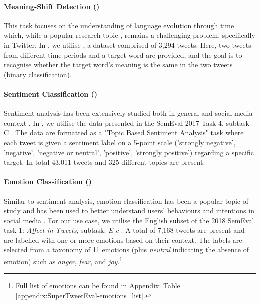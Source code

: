 \paragraph{Meaning-Shift Detection ({\TempoWiC})} This task focuses on the understanding of language evolution through time which, while a popular research topic \cite{luu-etal-2022-time, agarwal2022temporal}, remains a challenging problem, specifically in Twitter. In {\DATASET}, we utilise {\TempoWiC} \cite{loureiro-etal-2022-tempowic}, a dataset comprised of 3,294 tweets. Here, two tweets from different time periods and a target word are provided, and the goal is to recognise whether the target word's meaning is the same in the two tweets (binary classification).


\paragraph{Sentiment Classification ({\TweetSentiment})} Sentiment analysis has been extensively studied both in general \cite{medhat2014sentiment, wankhade2022survey} and social media context \cite{barbieri2022xlm, marcec2022using}. In {\DATASET}, we utilise the data presented in the SemEval 2017 Task 4, subtask C \cite{rosenthal-etal-2017-semeval}. The data are formatted as a  "Topic Based Sentiment Analysis" task where each tweet is given a sentiment label on a 5-point scale ('strongly negative', 'negative', 'negative or neutral', 'positive', 'strongly positive') regarding a specific target. In total 43,011 tweets and 325 different topics are present.

\paragraph{Emotion Classification ({\TweetEmotion})} Similar to sentiment analysis, emotion classification has been a popular topic of study \cite{kuvsen2017identifying, he2016exploring} and has been used to better understand users' behaviours and intentions in social media \cite{son2022emotion, corbett2022tweets}. For our use case, we utilise the English subset of the 2018 SemEval task 1: \textit{Affect in Tweets}, subtask: \textit{E-c}  \cite{mohammad-etal-2018-semeval}. A total of 7,168 tweets are present and are labelled with one or more emotions based on their context. The labels are selected from a taxonomy of 11 emotions (plus \textit{neutral} indicating the absence of emotion) such as \textit{anger}, \textit{fear}, and \textit{joy}.\footnote{Full list of emotions can be found in Appendix: Table \ref{appendix:SuperTweetEval-emotions_list}.}

